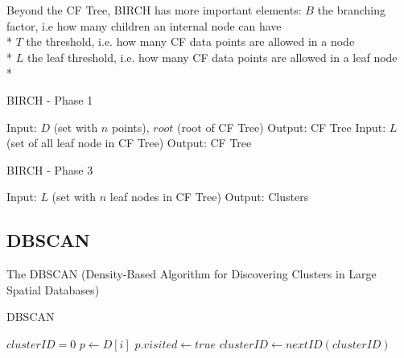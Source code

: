 \documentclass[conference, 10pt]{IEEEtran}
\begin{document}
  Beyond the CF Tree, BIRCH has more important elements:\vspace{1 mm}
  $B$ the branching factor, i.e how many children an internal node can have\\*
  $T$ the threshold, i.e. how many CF data points are allowed in a node\\*
  $L$ the leaf threshold, i.e. how many CF data points are allowed in a leaf node\\*

  \begin{algorithm}
  \caption{BIRCH - Phase 1}
  \begin{algorithmic}[1]
      \State Input: $D$ (set with $n$ points), $root$ (root of CF Tree)
      \State Output: CF Tree
          \Else
        \EndIf
      \EndFor
    \EndProcedure
      \State Input: $L$ (set of all leaf node in CF Tree)
      \State Output: CF Tree
    \EndProcedure
  \end{algorithmic}
  \end{algorithm}

  \begin{algorithm}
  \caption{BIRCH - Phase 3}
  \begin{algorithmic}[1]
      \State Input: $L$ (set with $n$ leaf nodes in CF Tree)
      \State Output: Clusters
        \EndIf
      \EndFor
    \EndProcedure
  \end{algorithmic}
  \end{algorithm}

  \subsection{DBSCAN}
  The DBSCAN (Density-Based Algorithm for Discovering Clusters in Large Spatial Databases)
  \begin{algorithm}
  \caption{DBSCAN}
  \begin{algorithmic}[1]
    \State $clusterID = 0$
        \State $p \gets D[i]$
        \State $p.visited \gets true$    
            \State $clusterID \gets nextID(clusterID)$
          \EndIf
        \EndIf
    \EndFor
  \EndProcedure
  \Statex
  \EndProcedure
  \end{algorithmic}
  \end{algorithm}
\end{document}
